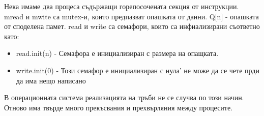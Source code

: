\documentclass[fleqn,12pt]{article}
\begin{document}
    Нека имаме два процеса съдържащи горепосочената секция от инструкции. mread и mwite са mutex-и, които предпазват опашката от данни. Q[n] - опашката от споделена памет. read и write са семафори, които са инфиализирани съответно като:
    
    \begin{itemize}
        \item read.init(n) - Семафора е инициализиран с размера на опащката.
        \item write.init(0) - Този семафор е инициализиран с нула' не може да се чете прди да има нещо написано
    \end{itemize}

    В операционната система реализацията на тръби не се случва по този начин. Отново има твърде много прекъсвания и прехвърляния между процесите.
\end{document}
